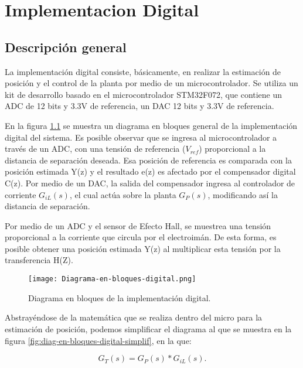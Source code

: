 \chapter{Implementacion Digital}  \label{cap:Implementacion Digital}

\section{Descripción general}

\noindent La implementación digital consiste, básicamente, en realizar la estimación de posición y el control de la planta por medio de un microcontrolador. Se utiliza un kit de desarrollo basado en el microcontrolador STM32F072, que contiene un ADC de 12 bits y 3.3V de referencia, un DAC 12 bits y 3.3V de referencia.

\noindent En la figura \ref{fig:diag-en-bloques-digital} se muestra un diagrama en bloques general de la implementación digital del sistema. Es posible observar que se ingresa al microcontrolador a través de un ADC, con una tensión de referencia ($V_{ref}$) proporcional a la distancia de separación deseada. Esa posición de referencia es comparada con la posición estimada Y(z) y el resultado e(z) es afectado por el compensador digital C(z). Por medio de un DAC, la salida del compensador ingresa al controlador de corriente $G_{iL}(s)$, el cual actúa sobre la planta $G_P(s)$, modificando así la distancia de separación.

\noindent Por medio de un ADC y el sensor de Efecto Hall, se muestrea una tensión proporcional a la corriente que circula por el electroimán. De esta forma, es posible obtener una posición estimada Y(z) al multiplicar esta tensión por la transferencia H(Z).


\begin{figure}[H]
	\centering
	\texttt{[image: Diagrama-en-bloques-digital.png]}
	\caption{Diagrama en bloques de la implementación digital.}
	\label{fig:diag-en-bloques-digital}
\end{figure}

\noindent Abstrayéndose de la matemática que se realiza dentro del micro para la estimación de posición, podemos simplificar el diagrama al que se muestra en la figura \ref{fig:diag-en-bloques-digital-simplif}, en la que:

\begin{equation} 
	G_T(s) = G_P(s) * G_{iL}(s).
\end{equation}

